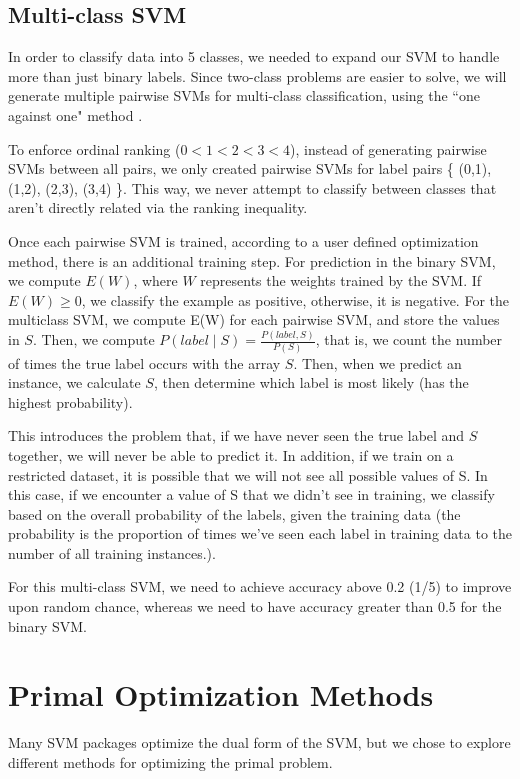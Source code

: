 \documentclass[letterpaper, 11pt]{article}
\begin{document}
\subsection{Multi-class SVM}
In order to classify data into 5 classes, we needed to expand our SVM to handle more than just binary labels.  Since two-class problems are easier to solve, we will generate multiple pairwise SVMs for multi-class classification, using the ``one against one" method \cite{milgram2006one}.

To enforce ordinal ranking ($0 < 1 < 2 < 3 < 4$), instead of generating pairwise SVMs between all pairs, we only created pairwise SVMs for label pairs \{ (0,1), (1,2), (2,3), (3,4) \}.  This way, we never attempt to classify between classes that aren't directly related via the ranking inequality.

Once each pairwise SVM is trained, according to a user defined optimization method, there is an additional training step.  For prediction in the binary SVM, we compute $E(W)$, where $W$ represents the weights trained by the SVM.  If $E(W) \ge 0$, we classify the example as positive, otherwise, it is negative.  For the multiclass SVM, we compute E(W) for each pairwise SVM, and store the values in $S$.  Then, we compute $P(label \mid S) = \frac{P(label, S)}{P(S)}$, that is, we count the number of times the true label occurs with the array $S$.  Then, when we predict an instance, we calculate $S$, then determine which label is most likely (has the highest probability).

This introduces the problem that, if we have never seen the true label and $S$ together, we will never be able to predict it.  In addition, if we train on a restricted dataset, it is possible that we will not see all possible values of S.  In this case, if we encounter a value of S that we didn't see in training, we classify based on the overall probability of the labels, given the training data (the probability is the proportion of times we've seen each label in training data to the number of all training instances.).

For this multi-class SVM, we need to achieve accuracy above 0.2 (1/5) to improve upon random chance, whereas we need to have accuracy greater than 0.5 for the binary SVM.

\section{Primal Optimization Methods}
Many SVM packages optimize the dual form of the SVM, but we chose to explore different methods for optimizing the primal problem.
\end{document}
